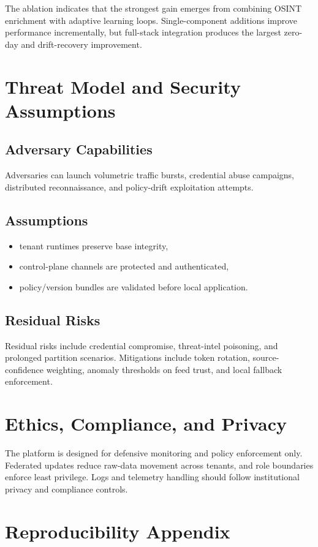 \documentclass[conference]{IEEEtran}
\begin{document}
The ablation indicates that the strongest gain emerges from combining OSINT enrichment with adaptive learning loops. Single-component additions improve performance incrementally, but full-stack integration produces the largest zero-day and drift-recovery improvement.

\section{Threat Model and Security Assumptions}
\subsection{Adversary Capabilities}
Adversaries can launch volumetric traffic bursts, credential abuse campaigns, distributed reconnaissance, and policy-drift exploitation attempts.

\subsection{Assumptions}
\begin{itemize}
  \item tenant runtimes preserve base integrity,
  \item control-plane channels are protected and authenticated,
  \item policy/version bundles are validated before local application.
\end{itemize}

\subsection{Residual Risks}
Residual risks include credential compromise, threat-intel poisoning, and prolonged partition scenarios. Mitigations include token rotation, source-confidence weighting, anomaly thresholds on feed trust, and local fallback enforcement.

\section{Ethics, Compliance, and Privacy}
The platform is designed for defensive monitoring and policy enforcement only. Federated updates reduce raw-data movement across tenants, and role boundaries enforce least privilege. Logs and telemetry handling should follow institutional privacy and compliance controls.

\section{Reproducibility Appendix}
\end{document}
